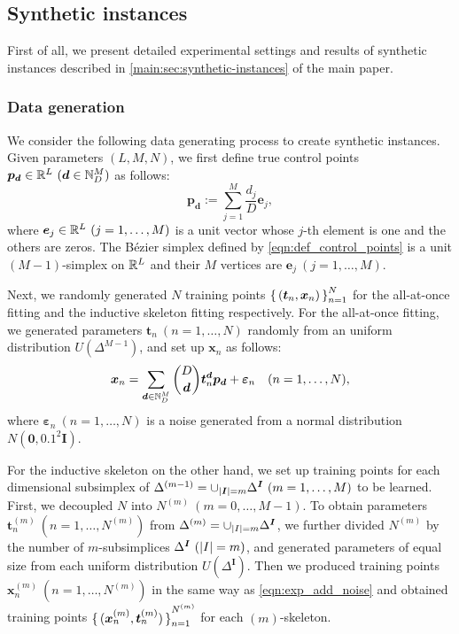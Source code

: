 \documentclass{article}
\begin{document}
\subsection{Synthetic instances}
First of all, we present detailed experimental settings and results of synthetic instances described in \cref{main:sec:synthetic-instances} of the main paper.

\subsubsection{Data generation}
We consider the following data generating process to create synthetic instances.
Given parameters $(L, M, N)$, we first define true control points $\bm p_{\bm d}\in \mathbb{R}^L~(\bm d \in \mathbb{N}^M_D)$ as follows:
\begin{equation}\label{eqn:def_control_points}
    \bm p_{\bm d} := \sum_{j=1}^M \frac{d_j}{D} \bm e_j,
\end{equation}
where $\bm e_j \in \mathbb{R}^L~(j = 1, \dots, M)$ is a unit vector whose $j$-th element is one and the others are zeros.
The B\'ezier simplex defined by \cref{eqn:def_control_points} is a unit $(M-1)$-simplex on $\mathbb{R}^L$ and their $M$ vertices are $\bm e_j~(j = 1, \dots, M)$.

Next, we randomly generated $N$ training points $\set{(\bm t_n, \bm x_n)}_{n = 1}^N$%
for the all-at-once fitting and the inductive skeleton fitting respectively.
For the all-at-once fitting, we generated parameters $\bm t_n~(n = 1, \dots, N)$ randomly from an uniform distribution $U(\Delta^{M-1})$, and set up $\bm x_n$ as follows:
\begin{equation}\label{eqn:exp_add_noise}
    \bm x_n = \sum_{\bm d \in \mathbb{N}^M_D} \binom{D}{\bm d} \bm t_n^{\bm d} \bm p_{\bm d} + \bm \varepsilon_n \quad (n = 1, \dots, N),
\end{equation}
where $\bm \varepsilon_n~(n = 1, \dots, N)$ is a noise generated from a normal distribution $N(\bm 0, 0.1^2 \bm I)$.

For the inductive skeleton on the other hand, we set up training points for each dimensional subsimplex of $\Delta^{(m-1)} = \cup_{\left| \bm I \right| = m} \Delta^{\bm{I}}~(m = 1, \dots, M)$ to be learned.
First, we decoupled $N$ into $N^{(m)}~(m = 0, \dots, M-1)$.
To obtain parameters $\bm{t}^{(m)}_n~(n = 1, \dots, N^{(m)})$ from $\Delta^{(m)} = \cup_{\left| I \right| = m} \Delta^{\bm{I}}$, we further divided $N^{(m)}$ by the number of $m$-subsimplices $\Delta^{\bm{I}}~(\left| I \right| = m)$, and generated parameters of equal size from each uniform distribution $U(\Delta^{\bm{I}})$.
Then we produced training points $\bm x^{(m)}_n~(n = 1, \dots, N^{(m)})$ in the same way as \cref{eqn:exp_add_noise} and obtained training points $\set{(\bm x_n^{(m)}, \bm t_n^{(m)})}_{n=1}^{N^{(m)}}$ for each $(m)$-skeleton.
\end{document}
